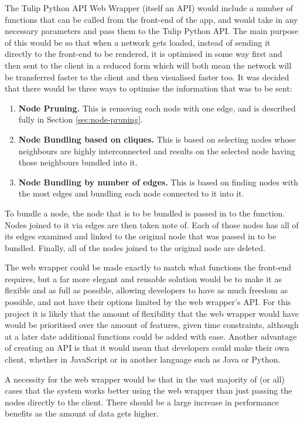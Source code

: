 \documentclass[../dissertation.tex]{subfiles}
\begin{document}
The Tulip Python API Web Wrapper (itself an API) would include a number of functions that can be called from the front-end of the app, and would take in any necessary parameters and pass them to the Tulip Python API. The main purpose of this would be so that when a network gets loaded, instead of sending it directly to the front-end to be rendered, it is optimised in some way first and then sent to the client in a reduced form which will both mean the network will be transferred faster to the client and then visualised faster too. It was decided that there would be three ways to optimise the information that was to be sent:
\begin{enumerate}
    \item \textbf{Node Pruning.} This is removing each node with one edge, and is described fully in Section \ref{sec:node-pruning}.
    \item \textbf{Node Bundling based on cliques.} This is based on selecting nodes whose neighbours are highly interconnected and results on the selected node having those neighbours bundled into it.
    \item \textbf{Node Bundling by number of edges.} This is based on finding nodes with the most edges and bundling each node connected to it into it.
\end{enumerate}

To bundle a node, the node that is to be bundled is passed in to the function. Nodes joined to it via edges are then taken note of. Each of those nodes has all of its edges examined and linked to the original node that was passed in to be bundled. Finally, all of the nodes joined to the original node are deleted.

The web wrapper could be made exactly to match what functions the front-end requires, but a far more elegant and reusable solution would be to make it as flexible and as full as possible, allowing developers to have as much freedom as possible, and not have their options limited by the web wrapper's API. For this project it is likely that the amount of flexibility that the web wrapper would have would be prioritised over the amount of features, given time constraints, although at a later date additional functions could be added with ease. Another advantage of creating an API is that it would mean that developers could make their own client, whether in JavaScript or in another language such as Java or Python.

A necessity for the web wrapper would be that in the vast majority of (or all) cases that the system works better using the web wrapper than just passing the nodes directly to the client. There should be a large increase in performance benefits as the amount of data gets higher.
\end{document}
